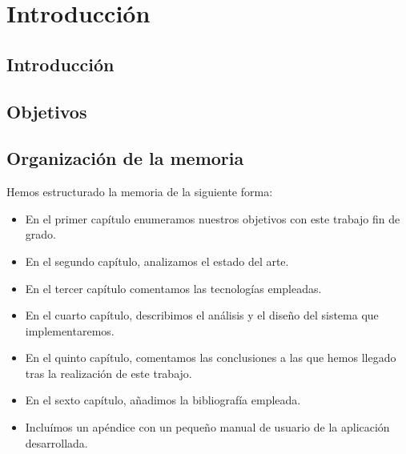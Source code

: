 \documentclass[12pt,a4paper,oneside,spanish]{book}
\newcounter{ri}
\begin{document}


\tableofcontents


\chapter{Introducción}

\section{Introducción}





\section{Objetivos}



\section{Organización de la memoria}

 Hemos estructurado la memoria de la siguiente forma:

\begin{itemize}
\item En el primer capítulo enumeramos nuestros objetivos con este trabajo fin de grado.
\item En el segundo capítulo, analizamos el estado del arte.
\item En el tercer capítulo comentamos las tecnologías empleadas.
\item En el cuarto capítulo, describimos el análisis y el diseño del sistema que implementaremos.
\item En el quinto capítulo, comentamos las conclusiones a las que hemos llegado tras la realización de este trabajo.
\item En el sexto capítulo, añadimos la bibliografía empleada.
\item Incluímos un apéndice con un pequeño manual de usuario de la aplicación desarrollada.
\end{itemize}







\end{document}
